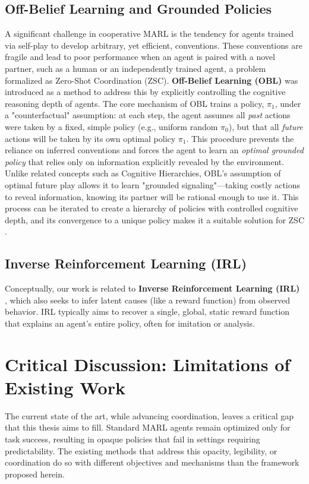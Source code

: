\documentclass[12pt, a4paper]{report}
\begin{document}
\subsection{Off-Belief Learning and Grounded Policies}
A significant challenge in cooperative MARL is the tendency for agents trained via self-play to develop arbitrary, yet efficient, conventions. These conventions are fragile and lead to poor performance when an agent is paired with a novel partner, such as a human or an independently trained agent, a problem formalized as Zero-Shot Coordination (ZSC). \textbf{Off-Belief Learning (OBL)} \cite{Hu_Lerer_Cui_Wu_Pineda_Brown_Foerster_2021} was introduced as a method to address this by explicitly controlling the cognitive reasoning depth of agents. The core mechanism of OBL trains a policy, $\pi_1$, under a "counterfactual" assumption: at each step, the agent assumes all \textit{past} actions were taken by a fixed, simple policy (e.g., uniform random $\pi_0$), but that all \textit{future} actions will be taken by its own optimal policy $\pi_1$. This procedure prevents the reliance on inferred conventions and forces the agent to learn an \textit{optimal grounded policy} that relies only on information explicitly revealed by the environment. Unlike related concepts such as Cognitive Hierarchies, OBL's assumption of optimal future play allows it to learn "grounded signaling"---taking costly actions to reveal information, knowing its partner will be rational enough to use it. This process can be iterated to create a hierarchy of policies with controlled cognitive depth, and its convergence to a unique policy makes it a suitable solution for ZSC \cite{Hu_Lerer_Cui_Wu_Pineda_Brown_Foerster_2021}.

\subsection{Inverse Reinforcement Learning (IRL)}
Conceptually, our work is related to \textbf{Inverse Reinforcement Learning (IRL)} \cite{ARORA2021103500} \cite{ziebart2008maximum}, which also seeks to infer latent causes (like a reward function) from observed behavior. IRL typically aims to recover a single, global, static reward function that explains an agent's entire policy, often for imitation or analysis.

\section{Critical Discussion: Limitations of Existing Work}
The current state of the art, while advancing coordination, leaves a critical gap that this thesis aims to fill. Standard MARL agents remain optimized only for task success, resulting in opaque policies that fail in settings requiring predictability. The existing methods that address this opacity, legibility, or coordination do so with different objectives and mechanisms than the framework proposed herein.
\end{document}
